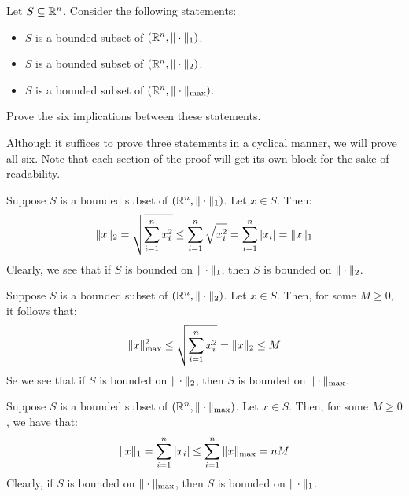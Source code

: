 \documentclass{article}
\begin{document}
\newpage
{}

\begin{qu}
    Let $ S \subseteq \mathbb{R}^{n} $. Consider the following statements:
    \begin{itemize}
        \item $ S $ is a bounded subset of $ (\mathbb{R}^{n}, \|\cdot\|_{1}) $.
        \item $ S $ is a bounded subset of $ (\mathbb{R}^{n}, \|\cdot\|_{2}) $.
        \item $ S $ is a bounded subset of $ (\mathbb{R}^{n}, \|\cdot\|_{\textrm{max}}) $.
    \end{itemize}
    Prove the six implications between these statements.
\end{qu}
Although it suffices to prove three statements in a cyclical manner,
we will prove all six. Note that each section of the proof will get its own block for
the sake of readability.

\begin{soln}[title=1 implies 2]
    Suppose $ S $ is a bounded subset of $ (\mathbb{R}^{n}, \|\cdot\|_{1}) $.
    Let $ x \in S $. Then:
    \begin{equation*}
        \|x\|_{2} = \sqrt{\sum_{i=1}^{n} {x_{i}^{2}} } \leq \sum_{i=1}^{n} {\sqrt{x_{i}^{2}}} 
        = \sum_{i=1}^{n} {\abs{x_{i}}} = \|x\|_{1}
    \end{equation*}
    Clearly, we see that if $ S $ is bounded on $ \|\cdot\|_{1} $,
    then $ S $ is bounded on $ \|\cdot\|_{2} $.
\end{soln}

\begin{soln}[title=2 implies Max]
    Suppose $ S $ is a bounded subset of $ (\mathbb{R}^{n}, \|\cdot\|_{2}) $.
    Let $ x \in S $. Then, for some $ M \geq 0 $, it follows that:
    \begin{equation*}
        \|x\|_{\textrm{max}}^{2} \leq \sqrt{\sum_{i=1}^{n} {x_{i}^{2}} } = \|x\|_{2} \leq M
    \end{equation*}
    Se we see that if $ S $ is bounded on $ \|\cdot\|_{2} $, then
    $ S $ is bounded on $ \|\cdot\|_{\textrm{max}} $.
\end{soln}

\begin{soln}[title=Max implies 1]
    Suppose $ S $ is a bounded subset of $ (\mathbb{R}^{n}, \|\cdot\|_{\textrm{max}}) $.
    Let $ x \in S $. Then, for some $ M \geq 0 $, we have that:
    \begin{equation*}
        \|x\|_{1} = \sum_{i=1}^{n} {\abs{x_{i}}} \leq \sum_{i=1}^{n} {\|x\|_{\textrm{max}}}
        = nM
    \end{equation*}
    Clearly, if $ S $ is bounded on $ \|\cdot\|_{\textrm{max}} $,
    then $ S $ is bounded on $ \|\cdot\|_{1} $.
\end{soln}
\end{document}
